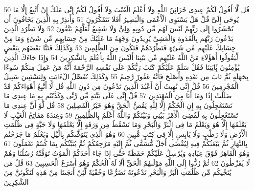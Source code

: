 \documentclass[20pt,a4paper]{article}
\begin{document}
{\tiny\colorbox{cl_aya}{50}} قُل لَّا أَقُولُ لَكُمْ عِندِى خَزَائِنُ اللَّهِ وَلَا أَعْلَمُ الْغَيْبَ وَلَا أَقُولُ لَكُمْ إِنِّى مَلَكٌ إِنْ أَتَّبِعُ إِلَّا مَا يُوحَى إِلَىَّ قُلْ هَلْ يَسْتَوِى الْأَعْمَى وَالْبَصِيرُ أَفَلَا تَتَفَكَّرُونَ
{\tiny\colorbox{cl_aya}{51}} وَأَنذِرْ بِهِ الَّذِينَ يَخَافُونَ أَن يُحْشَرُوا إِلَى رَبِّهِمْ لَيْسَ لَهُم مِّن دُونِهِ وَلِىٌّ وَلَا شَفِيعٌ لَّعَلَّهُمْ يَتَّقُونَ
{\tiny\colorbox{cl_aya}{52}} وَلَا تَطْرُدِ الَّذِينَ يَدْعُونَ رَبَّهُم بِالْغَدَوةِ وَالْعَشِىِّ يُرِيدُونَ وَجْهَهُ مَا عَلَيْكَ مِنْ حِسَابِهِم مِّن شَىْءٍ وَمَا مِنْ حِسَابِكَ عَلَيْهِم مِّن شَىْءٍ فَتَطْرُدَهُمْ فَتَكُونَ مِنَ الظَّلِمِينَ
{\tiny\colorbox{cl_aya}{53}} وَكَذَلِكَ فَتَنَّا بَعْضَهُم بِبَعْضٍ لِّيَقُولُوا أَهَؤُلَاءِ مَنَّ اللَّهُ عَلَيْهِم مِّن بَيْنِنَا أَلَيْسَ اللَّهُ بِأَعْلَمَ بِالشَّكِرِينَ
{\tiny\colorbox{cl_aya}{54}} وَإِذَا جَاءَكَ الَّذِينَ يُؤْمِنُونَ بَِٔايَتِنَا فَقُلْ سَلَمٌ عَلَيْكُمْ كَتَبَ رَبُّكُمْ عَلَى نَفْسِهِ الرَّحْمَةَ أَنَّهُ مَنْ عَمِلَ مِنكُمْ سُوءًا بِجَهَلَةٍ ثُمَّ تَابَ مِن بَعْدِهِ وَأَصْلَحَ فَأَنَّهُ غَفُورٌ رَّحِيمٌ
{\tiny\colorbox{cl_aya}{55}} وَكَذَلِكَ نُفَصِّلُ الْءَايَتِ وَلِتَسْتَبِينَ سَبِيلُ الْمُجْرِمِينَ
{\tiny\colorbox{cl_aya}{56}} قُلْ إِنِّى نُهِيتُ أَنْ أَعْبُدَ الَّذِينَ تَدْعُونَ مِن دُونِ اللَّهِ قُل لَّا أَتَّبِعُ أَهْوَاءَكُمْ قَدْ ضَلَلْتُ إِذًا وَمَا أَنَا مِنَ الْمُهْتَدِينَ
{\tiny\colorbox{cl_aya}{57}} قُلْ إِنِّى عَلَى بَيِّنَةٍ مِّن رَّبِّى وَكَذَّبْتُم بِهِ مَا عِندِى مَا تَسْتَعْجِلُونَ بِهِ إِنِ الْحُكْمُ إِلَّا لِلَّهِ يَقُصُّ الْحَقَّ وَهُوَ خَيْرُ الْفَصِلِينَ
{\tiny\colorbox{cl_aya}{58}} قُل لَّوْ أَنَّ عِندِى مَا تَسْتَعْجِلُونَ بِهِ لَقُضِىَ الْأَمْرُ بَيْنِى وَبَيْنَكُمْ وَاللَّهُ أَعْلَمُ بِالظَّلِمِينَ
{\tiny\colorbox{cl_aya}{59}} وَعِندَهُ مَفَاتِحُ الْغَيْبِ لَا يَعْلَمُهَا إِلَّا هُوَ وَيَعْلَمُ مَا فِى الْبَرِّ وَالْبَحْرِ وَمَا تَسْقُطُ مِن وَرَقَةٍ إِلَّا يَعْلَمُهَا وَلَا حَبَّةٍ فِى ظُلُمَتِ الْأَرْضِ وَلَا رَطْبٍ وَلَا يَابِسٍ إِلَّا فِى كِتَبٍ مُّبِينٍ
{\tiny\colorbox{cl_aya}{60}} وَهُوَ الَّذِى يَتَوَفَّىكُم بِالَّيْلِ وَيَعْلَمُ مَا جَرَحْتُم بِالنَّهَارِ ثُمَّ يَبْعَثُكُمْ فِيهِ لِيُقْضَى أَجَلٌ مُّسَمًّى ثُمَّ إِلَيْهِ مَرْجِعُكُمْ ثُمَّ يُنَبِّئُكُم بِمَا كُنتُمْ تَعْمَلُونَ
{\tiny\colorbox{cl_aya}{61}} وَهُوَ الْقَاهِرُ فَوْقَ عِبَادِهِ وَيُرْسِلُ عَلَيْكُمْ حَفَظَةً حَتَّى إِذَا جَاءَ أَحَدَكُمُ الْمَوْتُ تَوَفَّتْهُ رُسُلُنَا وَهُمْ لَا يُفَرِّطُونَ
{\tiny\colorbox{cl_aya}{62}} ثُمَّ رُدُّوا إِلَى اللَّهِ مَوْلَىهُمُ الْحَقِّ أَلَا لَهُ الْحُكْمُ وَهُوَ أَسْرَعُ الْحَسِبِينَ
{\tiny\colorbox{cl_aya}{63}} قُلْ مَن يُنَجِّيكُم مِّن ظُلُمَتِ الْبَرِّ وَالْبَحْرِ تَدْعُونَهُ تَضَرُّعًا وَخُفْيَةً لَّئِنْ أَنجَىنَا مِنْ هَذِهِ لَنَكُونَنَّ مِنَ الشَّكِرِينَ
\end{document}
